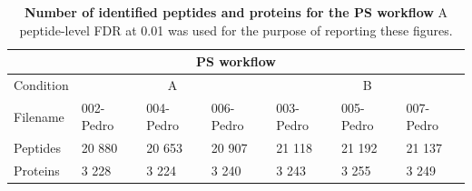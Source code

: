 \documentclass[11pt]{article}
\begin{document}
\begin{table}[h]
    \begin{tabular}{l|lll|lll}
    \hline
    \multicolumn{7}{c}{PS workflow}                                                                                                                                                                                   \\ \hline
    Condition & \multicolumn{3}{c|}{A}                                                                         & \multicolumn{3}{c}{B}                                                                         \\
    \hline
    Filename       & 002-Pedro & 004-Pedro & 006-Pedro & 003-Pedro & 005-Pedro & 007-Pedro \\
    \hline
    Peptides  & 20 880                        & 20 653                        & 20 907                        & 21 118                        & 21 192                        & 21 137                        \\
    Proteins  & 3 228                         & 3 224                         & 3 240                         & 3 243                         & 3 255                         & 3 249                         \\ \hline
    \end{tabular}
     \caption{{\bf Number of identified peptides and proteins for the PS workflow} A peptide-level FDR at 0.01 was used for the purpose of reporting these figures.
          \label{fig:diann_peptide_and_protein_id}}
\end{table}
\end{document}
